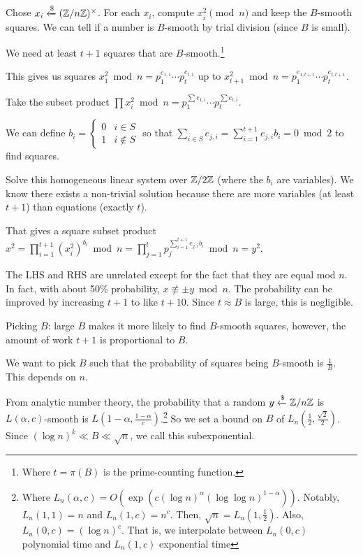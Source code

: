 \documentclass[notes]{agony}
\newcommand{\xgets}{\xleftarrow}
\newcommand{\mgrp}[1]{(\Z/#1\Z)^\times}
\begin{document}
Chose $x_i \xgets{\$} \mgrp{n}$.
For each $x_i$, compute $x_i^2 \pmod n$ and keep the $B$-smooth squares.
We can tell if a number is $B$-smooth by trial division (since $B$ is small).

We need at least $t+1$ squares that are $B$-smooth.\footnote{Where $t=\pi(B)$ is the prime-counting function.}

This gives us squares $x_1^2 \bmod n = p_1^{e_{1,1}}\dotsb p_t^{e_{t,1}}$
up to $x_{t+1}^2 \bmod n = p_1^{e_{1,t+1}}\dotsb p_t^{e_{t,t+1}}$.

Take the subset product $\prod x_i^2 \bmod n = p_1^{\sum e_{1,i}}\dotsb p_t^{\sum e_{t,i}}$.

We can define $b_i = \begin{cases}0 & i \in S \\ 1 & i \not\in S\end{cases}$
so that $\sum_{i\in S}e_{j,i} = \sum_{i=1}^{t+1}e_{j,i}b_i = 0 \bmod 2$
to find squares.

Solve this homogeneous linear system over $\mathbb{Z}/2\mathbb{Z}$ (where the $b_i$ are variables).
We know there exists a non-trivial solution because there are more variables (at least $t+1$) than equations (exactly $t$).

That gives a square subset product $x^2 = \prod\limits_{i=1}^{t+1} (x_i^2)^{b_i} \bmod n
  = \prod\limits_{j=1}^t p_j^{\sum_{i=1}^{t+1} e_{j,i} b_i} \bmod n = y^2$.

The LHS and RHS are unrelated except for the fact that they are equal mod $n$.
In fact, with about 50\% probability, $x \not\equiv \pm y \bmod n$.
The probability can be improved by increasing $t+1$ to like $t+10$.
Since $t \approx B$ is large, this is negligible.

Picking $B$: large $B$ makes it more likely to find $B$-smooth squares, however,
the amount of work $t+1$ is proportional to $B$.

We want to pick $B$ such that the probability of squares being $B$-smooth is $\frac1B$.
This depends on $n$.

From analytic number theory, the probability that a random $y \xgets{\$} \Z/n\Z$
is $L(\alpha,c)$-smooth is $L(1-\alpha,\frac{1-\alpha}{c})$.\footnote{Where $L_n(\alpha,c) = O(\exp(c(\log n)^\alpha(\log\log n)^{1-\alpha}))$.
  Notably, $L_n(1,1) = n$ and $L_n(1,c) = n^c$. Then, $\sqrt{n} = L_n(1,\frac12)$.
  Also, $L_n(0,c) = (\log n)^c$.
  That is, we interpolate between $L_n(0,c)$ polynomial time and $L_n(1,c)$ exponential time}
So we set a bound on $B$ of $L_n(\frac12,\frac{\sqrt2}{2})$.
Since $(\log n)^k \ll B \ll \sqrt{n}$, we call this subexponential.
\end{document}
